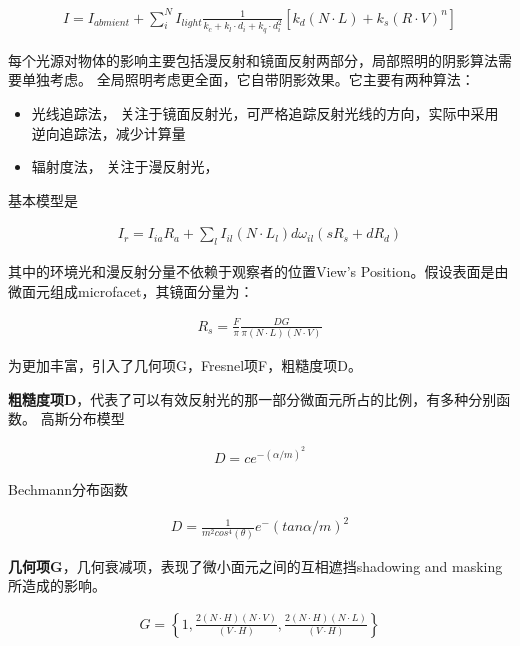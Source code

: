 \begin{align*}
    I = I_{abmient} + \sum_{i}^{N}I_{light}\frac{1}{k_{c}+k_{l} \cdot d_{i} + k_{q} \cdot d_{i}^2}
    \left[ k_{d}(N \cdot L) + k_{s}(R \cdot V)^n \right]
\end{align*}

每个光源对物体的影响主要包括漫反射和镜面反射两部分，局部照明的阴影算法需要单独考虑。
\newline
全局照明考虑更全面，它自带阴影效果。它主要有两种算法：
\begin{itemize}
    \item {光线追踪法， 关注于镜面反射光，可严格追踪反射光线的方向，实际中采用逆向追踪法，减少计算量}
    \item {辐射度法， 关注于漫反射光，}
\end{itemize}
基本模型是 
\newline

\begin{align*}
    I_r = I_{ia}R_{a} + \sum_{l}I_{il}(N \cdot L_{l})d \omega_{il}(sR_{s} + dR_{d})
\end{align*}

其中的环境光和漫反射分量不依赖于观察者的位置View's Position。假设表面是由微面元组成microfacet，其镜面分量为：
\newline

\begin{align*}
    R_s = \frac{F}{\pi} \frac{DG}{\pi (N \cdot L)(N \cdot V)}
\end{align*}

为更加丰富，引入了几何项G，Fresnel项F，粗糙度项D。
\newline

\textbf{粗糙度项D}，代表了可以有效反射光的那一部分微面元所占的比例，有多种分别函数。
高斯分布模型
\newline

\begin{align*}
    D = ce^{-(\alpha / m)^2}
\end{align*}

Bechmann分布函数
\newline

\begin{align*}
    D = \frac{1}{m^2cos^4(\theta)}e^-(tan\alpha / m)^2
\end{align*}

\textbf{几何项G}，几何衰减项，表现了微小面元之间的互相遮挡shadowing and masking所造成的影响。
\newline

\begin{align*}
    G = \left\{
        1, \frac{2(N \cdot H)(N \cdot V)}{(V \cdot H)}, \frac{2(N \cdot H)(N \cdot L)}{(V \cdot H)} 
    \right\}
\end{align*}

